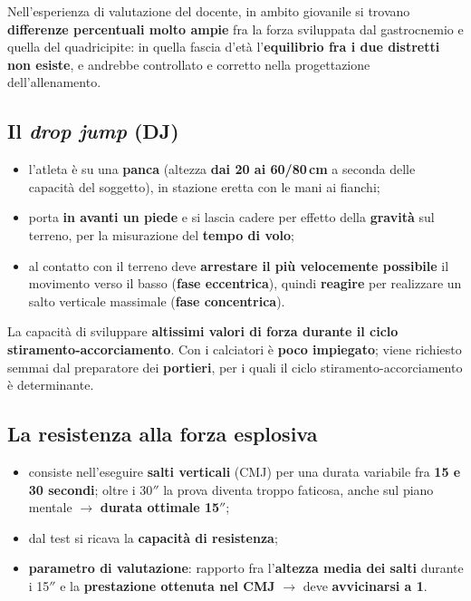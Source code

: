 Nell'esperienza di valutazione del docente, in ambito giovanile si trovano \textbf{differenze
percentuali molto ampie} fra la forza sviluppata dal gastrocnemio e quella del quadricipite: in
quella fascia d'età l'\textbf{equilibrio fra i due distretti non esiste}, e andrebbe controllato e
corretto nella progettazione dell'allenamento.

\subsection{Il \texorpdfstring{\textit{drop jump}}{drop jump} (DJ)}

\begin{itemize}
  \item l'atleta è su una \textbf{panca} (altezza \textbf{dai 20 ai 60/80\,cm} a seconda delle
    capacità del soggetto), in stazione eretta con le mani ai fianchi;
  \item porta \textbf{in avanti un piede} e si lascia cadere per effetto della \textbf{gravità} sul
    terreno, per la misurazione del \textbf{tempo di volo};
  \item al contatto con il terreno deve \textbf{arrestare il più velocemente possibile} il movimento
    verso il basso (\textbf{fase eccentrica}), quindi \textbf{reagire} per realizzare un salto
    verticale massimale (\textbf{fase concentrica}).
\end{itemize}

La capacità di sviluppare \textbf{altissimi valori di forza durante il ciclo
stiramento-accorciamento}. Con i calciatori è \textbf{poco impiegato}; viene richiesto semmai dal
preparatore dei \textbf{portieri}, per i quali il ciclo stiramento-accorciamento è determinante.

\subsection{La resistenza alla forza esplosiva}

\begin{itemize}
  \item consiste nell'eseguire \textbf{salti verticali} (CMJ) per una durata variabile fra
    \textbf{15 e 30 secondi}; oltre i 30$''$ la prova diventa troppo faticosa, anche sul piano
    mentale $\rightarrow$ \textbf{durata ottimale 15$''$};
  \item dal test si ricava la \textbf{capacità di resistenza};
  \item \textbf{parametro di valutazione}: rapporto fra l'\textbf{altezza media dei salti} durante i
    15$''$ e la \textbf{prestazione ottenuta nel CMJ} $\rightarrow$ deve \textbf{avvicinarsi a 1}.
\end{itemize}

